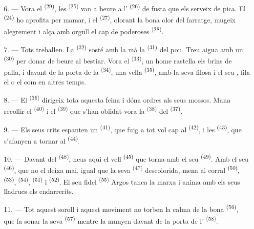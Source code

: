 6. --- Vora el  \textsuperscript{(29)}, les 
\textsuperscript{(25)} van a beure a l' \textsuperscript{(26)} de
fusta que els serveix de pica. El  \textsuperscript{(24)} ho
aprofita per mamar, i el  \textsuperscript{(27)}, olorant la bona olor
del farratge, mugeix alegrement i alça amb orgull el cap de poderoses
 \textsuperscript{(28)}.

7. --- Tots treballen. La  \textsuperscript{(32)} sosté amb la mà la
 \textsuperscript{(31)} del pou. Treu aigua amb un 
\textsuperscript{(30)} per donar de beure al bestiar. Vora el 
\textsuperscript{(33)}, un home rastella els brins de palla, i davant de la porta
de la  \textsuperscript{(34)}, una vella 
\textsuperscript{(35)}, amb la seva filosa i el seu , fila el
 o el  com en altres temps.

\VUsaut{3.0mm}
\VUsaut{3.0mm}

8. --- El  \textsuperscript{(36)} dirigeix tota aquesta feina i dóna
ordres als seus mossos. Mana recollir el  \textsuperscript{(40)} i
el  \textsuperscript{(39)} que s'han oblidat vora la 
\textsuperscript{(38)} del  \textsuperscript{(37)}.

9. --- Els seus crits espanten un  \textsuperscript{(41)}, que fuig a
tot vol cap al  \textsuperscript{(42)}, i les 
\textsuperscript{(43)}, que s'afanyen a tornar al 
\textsuperscript{(44)}.

10. --- Davant del  \textsuperscript{(48)}, heus aquí el
vell  \textsuperscript{(45)} que torna amb el seu 
\textsuperscript{(49)}. Amb el seu  \textsuperscript{(46)}, que no
el deixa mai, igual que la seva  \textsuperscript{(47)} descolorida,
mena al corral  \textsuperscript{(50)}, 
\textsuperscript{(53)},  \textsuperscript{(54)},
 \textsuperscript{(51)} i 
\textsuperscript{(52)}. El seu fidel  \textsuperscript{(55)} Argos
tanca la marxa i anima amb els seus lladrucs els endarrerits.

11. --- Tot aquest soroll i aquest moviment no torben la calma de la bona
 \textsuperscript{(56)}, que fa sonar la seva 
\textsuperscript{(57)} mentre la munyen davant de la porta de l'
\textsuperscript{(58)}.

